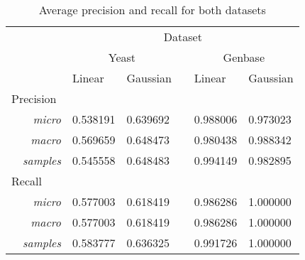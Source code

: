 \begin{table}[!ht]
    \centering
    \caption{Average precision and recall for both datasets}
    \label{results:pr_table}
    \begin{tabular}{@{}lrllcll@{}}
    \toprule
     &         & \multicolumn{5}{c}{Dataset}                             \\ \cmidrule{3-7}
     &         & \multicolumn{2}{c}{Yeast} &\phantom{abc} & \multicolumn{2}{c}{Genbase} \\ \cmidrule{3-4} \cmidrule{6-7}
     &                      & Linear     & Gaussian  && Linear    & Gaussian  \\ \midrule
\multicolumn{2}{l}{Precision} \\
     & \textit{micro}       & 0.538191   & 0.639692  &&  0.988006 & 0.973023  \\
     & \textit{macro}       & 0.569659   & 0.648473  &&  0.980438 & 0.988342  \\
     & \textit{samples}     & 0.545558   & 0.648483  &&  0.994149 & 0.982895  \\
\multicolumn{2}{l}{Recall} \\
     & \textit{micro}       & 0.577003   & 0.618419  &&  0.986286 & 1.000000  \\
     & \textit{macro}       & 0.577003   & 0.618419  &&  0.986286 & 1.000000  \\
     & \textit{samples}     & 0.583777   & 0.636325  &&  0.991726 & 1.000000  \\ \bottomrule
    \end{tabular}
\end{table}
